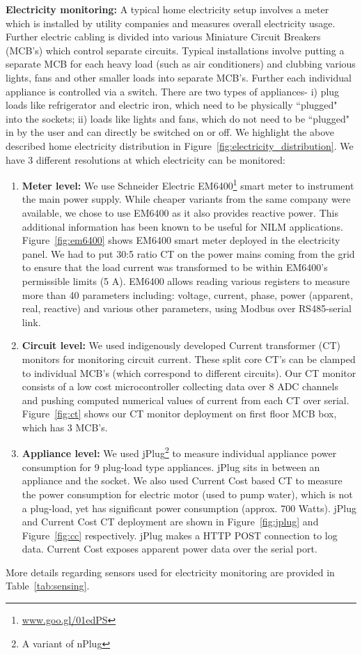 \documentclass[10pt]{sensys-proc}
\newcommand{\figref}[1]{Figure~\ref{#1}}
\newcommand{\tabref}[1]{Table~\ref{#1}}
\begin{document}
\noindent\textbf{Electricity monitoring:} A typical home electricity setup involves a meter which is installed by utility companies and measures overall electricity usage. Further electric cabling is divided into various Miniature Circuit Breakers (MCB's) which control separate circuits. Typical installations involve putting a separate MCB for each heavy load (such as air conditioners) and clubbing various lights, fans and other smaller loads into separate MCB's. Further each individual appliance is controlled via a switch. There are two types of appliances- i) plug loads like refrigerator and electric iron, which need to be physically ``plugged" into the sockets; ii) loads like lights and fans, which do not need to be ``plugged" in by the user and can directly be switched on or off. We highlight the above described home electricity distribution in \figref{fig:electricity_distribution}. We have 3 different resolutions at which electricity can be monitored:
\begin{enumerate}
\item \textbf{Meter level:} We use Schneider Electric EM6400\footnote{\url{www.goo.gl/01edPS}} smart meter to instrument the main power supply. While cheaper variants from the same company were available, we chose to use EM6400 as it also provides reactive power. This additional information has been known to be useful for NILM applications\cite{hart}. \figref{fig:em6400} shows EM6400 smart meter deployed in the electricity panel. We had to put 30:5 ratio CT on the power mains coming from the grid to ensure that the load current was transformed to be within EM6400's permissible limits (5 A). EM6400 allows reading various registers to measure more than 40 parameters including: voltage, current, phase, power (apparent, real, reactive) and various other parameters, using Modbus over RS485-serial link.

\item \textbf{Circuit level:} We used indigenously developed Current transformer (CT) monitors for monitoring circuit current. These split core CT's can be clamped to individual MCB's (which correspond to different circuits). Our CT monitor consists of a low cost microcontroller collecting data over 8 ADC channels and pushing computed numerical  values of current from each CT over serial. \figref{fig:ct} shows our CT monitor deployment on first floor MCB box, which has 3 MCB's.

\item \textbf{Appliance level:} We used jPlug\footnote{A variant of nPlug\cite{nplug}} to measure individual appliance power consumption for 9 plug-load type appliances. jPlug sits in between an appliance and the socket. We also used Current Cost based CT to measure the power consumption for electric motor (used to pump water), which is not a plug-load, yet has significant power consumption (approx. 700 Watts). jPlug and Current Cost CT deployment are shown in \figref{fig:jplug} and \figref{fig:cc} respectively. jPlug makes a HTTP POST connection to log data. Current Cost exposes apparent power data over the serial port.
\end{enumerate}
More details regarding sensors used for electricity monitoring are provided in \tabref{tab:sensing}.
\end{document}
